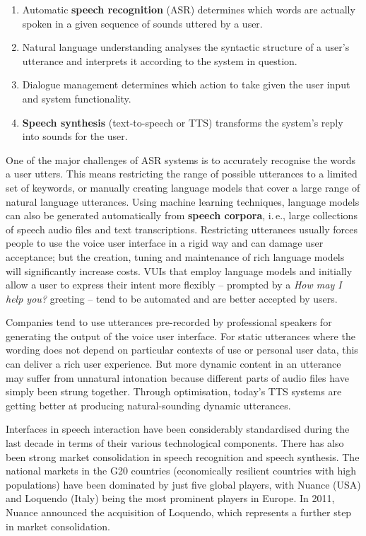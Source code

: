 \begin{multicols}{2}
\begin{enumerate}
\item Automatic \textbf{speech recognition} (ASR) determines which words are actually spoken in a given sequence of sounds uttered by a user.  
\columnbreak
\item Natural language understanding analyses the syntactic structure of a user’s utterance and interprets it according to the system in question.
\item Dialogue management determines which action to take given the user input and system functionality.   
\item \textbf{Speech synthesis} (text-to-speech or TTS) transforms the system’s reply into sounds for the user.
\end{enumerate}

One of the major challenges of ASR systems is to accurately recognise the words a user utters. This means restricting the range of possible utterances to a limited set of keywords, or manually creating language models that cover a large range of natural language utterances. Using machine learning techniques, language models can also be generated automatically from \textbf{speech corpora}, i.\,e., large collections of speech audio files and text transcriptions. Restricting utterances usually forces people to use the voice user interface in a rigid way and can damage user acceptance; but the creation, tuning and maintenance of rich language models will significantly increase costs. VUIs that employ language models and initially allow a user to express their intent more flexibly -- prompted by a \textit{How may I help you?} greeting -- tend to be automated and are better accepted by users.


Companies tend to use utterances pre-recorded by professional speakers for generating the output of the voice user interface. For static utterances where the wording does not depend on particular contexts of use or personal user data, this can deliver a rich user experience. But more dynamic content in an utterance may suffer from unnatural intonation because different parts of audio files have simply been strung together. Through optimisation, today’s TTS systems are getting better at producing natural-sounding dynamic utterances.

Interfaces in speech interaction have been considerably standardised during the last decade in terms of their various technological components. There has also been strong market consolidation in speech recognition and speech synthesis. The national markets in the G20 countries (economically resilient countries with high populations) have been dominated by just five global players, with Nuance (USA) and Loquendo (Italy) being the most prominent players in Europe. In 2011, Nuance announced the acquisition of Loquendo, which represents a further step in market consolidation.


\end{multicols}

